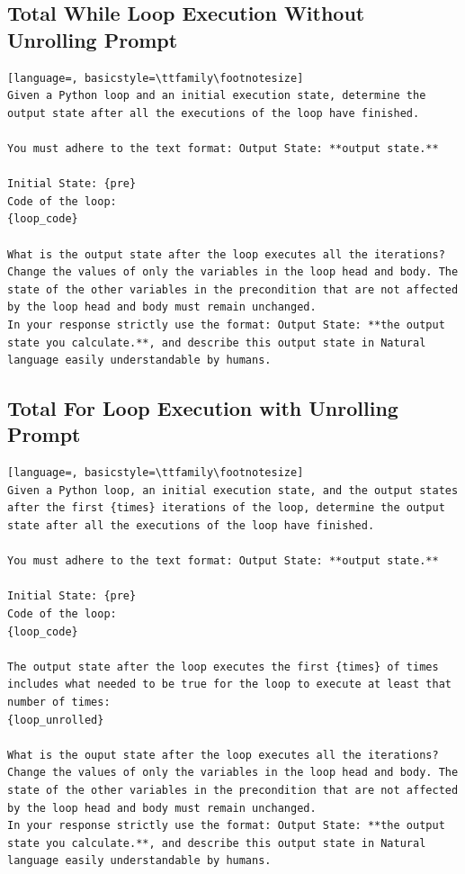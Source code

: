 \documentclass[sigconf]{acmart}
\begin{document}
\subsection{Total While Loop Execution Without Unrolling Prompt}
\label{while_NO_UNROLL_PROMPT}
\begin{tcolorbox}[ colback=gray!10, colframe=black, arc=5pt]
\begin{lstlisting}[language=, basicstyle=\ttfamily\footnotesize]
Given a Python loop and an initial execution state, determine the output state after all the executions of the loop have finished.

You must adhere to the text format: Output State: **output state.**

Initial State: {pre}
Code of the loop:
{loop_code}

What is the output state after the loop executes all the iterations? Change the values of only the variables in the loop head and body. The state of the other variables in the precondition that are not affected by the loop head and body must remain unchanged.
In your response strictly use the format: Output State: **the output state you calculate.**, and describe this output state in Natural language easily understandable by humans.

\end{lstlisting}
\end{tcolorbox}


\subsection{Total For Loop Execution with Unrolling Prompt}
\label{total_for_prompt}
\begin{tcolorbox}[ colback=gray!10, colframe=black, arc=5pt]
\begin{lstlisting}[language=, basicstyle=\ttfamily\footnotesize]
Given a Python loop, an initial execution state, and the output states after the first {times} iterations of the loop, determine the output state after all the executions of the loop have finished.

You must adhere to the text format: Output State: **output state.**

Initial State: {pre}
Code of the loop:
{loop_code}

The output state after the loop executes the first {times} of times includes what needed to be true for the loop to execute at least that number of times:
{loop_unrolled}

What is the ouput state after the loop executes all the iterations? Change the values of only the variables in the loop head and body. The state of the other variables in the precondition that are not affected by the loop head and body must remain unchanged.
In your response strictly use the format: Output State: **the output state you calculate.**, and describe this output state in Natural language easily understandable by humans.

\end{lstlisting}
\end{tcolorbox}
\end{document}
